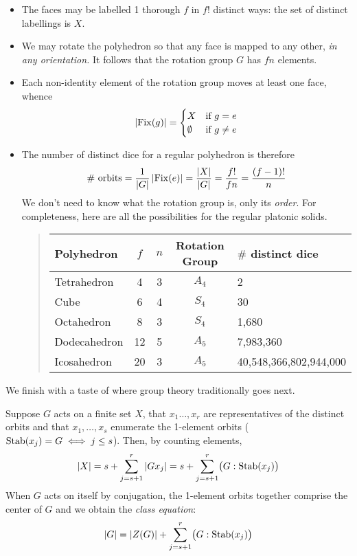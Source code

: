 \begin{itemize}
  \item The faces may be labelled 1 thorough $f$ in $f!$ distinct ways: the set of distinct labellings is $X$.
  \item We may rotate the polyhedron so that any face is mapped to any other, \emph{in any orientation.} It follows that the rotation group $G$ has $fn$ elements.
	\item Each non-identity element of the rotation group moves at least one face, whence
	\[\left| \operatorname{Fix}(g)\right|=\begin{cases}
	X&\text{if }g=e\\
	\emptyset&\text{if }g\neq e
	\end{cases}\]
	\item The number of distinct dice for a regular polyhedron is therefore
	\[\text{\# orbits}=\frac 1{\left| G\right|}\left| \operatorname{Fix}(e)\right|=\frac{\left| X\right|}{\left| G\right|}=\frac{f!}{fn}=\frac{(f-1)!}{n}\]
	We don't need to know what the rotation group is, only its \emph{order}. For completeness, here are all the possibilities for the regular platonic solids.
	\begin{quote}
	\begin{tabular}{l|c|c|c|l}
		Polyhedron & $f$ & $n$ & Rotation Group & $\#$ distinct dice\\\hline
		Tetrahedron & 4 & 3 & $A_4$ & 2\\
		Cube & 6 & 4 & $S_4$ & 30\\
		Octahedron & 8 & 3 &  $S_4$ & 1,680\\
		Dodecahedron & 12 & 5 & $A_5$ & 7,983,360\\
		Icosahedron & 20 & 3 & $A_5$ & 40,548,366,802,944,000
	\end{tabular}
	\end{quote}
\end{itemize} 


\goodbreak


We finish with a taste of where group theory traditionally goes next.\smallbreak

Suppose $G$ acts on a finite set $X$, that $x_1\ldots,x_r$ are representatives of the distinct orbits and that $x_1,\ldots,x_s$ enumerate the 1-element orbits ($\operatorname{Stab}(x_j)=G \iff j\le s$). Then, by counting elements,
\[\left| X\right|=s+\sum_{j=s+1}^r\left| Gx_j\right| =s+\sum_{j=s+1}^r\bigl(G:\operatorname{Stab}(x_j)\bigr)\]
When $G$ acts on itself by conjugation, the 1-element orbits together comprise the center of $G$ and we obtain the \emph{class equation}:
\[\left| G\right|=\left| Z(G)\right|+\sum_{j=s+1}^r \bigl(G:\operatorname{Stab}(x_j)\bigr)\]

